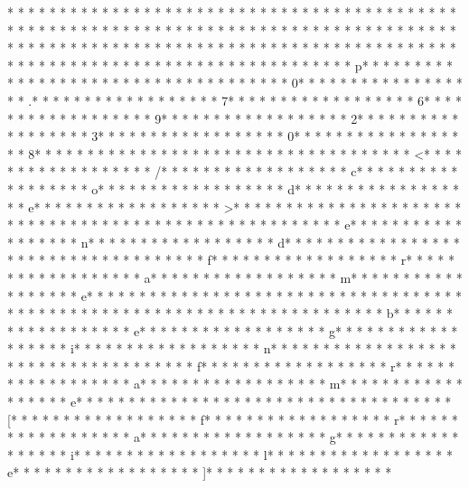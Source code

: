 * * *  * * *  * * *  *  * * *  *  * * *  *  * * *  * * *  * * *  *  * * *  *  * * *  *  * * *  * * *  * * *  *  * * *  *  * * *  *  * * *  * * *  * * *  *  * * *  *  * * *  *  * * *  * * *  * * *  *  * * *  *  * * *  *  * * *  * * *  * * *  *  * * *  *  * * *  *  * * *  * * *  * * *  *  * * *  *  * * *  *  * * *  * * *  * * *  *  * * *  *  * * *  *  * * *  * * *  * * *  *  * * *  *  * * *  * p* * *  * * *  * * *  *  * * *  *  * * *  * 
* * *  * * *  * * *  *  * * *  *  * * *  * 0* * *  * * *  * * *  *  * * *  *  * * *  * .* * *  * * *  * * *  *  * * *  *  * * *  * 7* * *  * * *  * * *  *  * * *  *  * * *  * 6* * *  * * *  * * *  *  * * *  *  * * *  * 9* * *  * * *  * * *  *  * * *  *  * * *  * 2* * *  * * *  * * *  *  * * *  *  * * *  * 3* * *  * * *  * * *  *  * * *  *  * * *  * 0* * *  * * *  * * *  *  * * *  *  * * *  * 8* * *  * * *  * * *  *  * * *  *  * * *  * 
* * *  * * *  * * *  *  * * *  *  * * *  * <* * *  * * *  * * *  *  * * *  *  * * *  * /* * *  * * *  * * *  *  * * *  *  * * *  * c* * *  * * *  * * *  *  * * *  *  * * *  * o* * *  * * *  * * *  *  * * *  *  * * *  * d* * *  * * *  * * *  *  * * *  *  * * *  * e* * *  * * *  * * *  *  * * *  *  * * *  * >* * *  * * *  * * *  *  * * *  *  * * *  * 
* * *  * * *  * * *  *  * * *  *  * * *  * 
* * *  * * *  * * *  *  * * *  *  * * *  * e* * *  * * *  * * *  *  * * *  *  * * *  * n* * *  * * *  * * *  *  * * *  *  * * *  * d* * *  * * *  * * *  *  * * *  *  * * *  * {* * *  * * *  * * *  *  * * *  *  * * *  * f* * *  * * *  * * *  *  * * *  *  * * *  * r* * *  * * *  * * *  *  * * *  *  * * *  * a* * *  * * *  * * *  *  * * *  *  * * *  * m* * *  * * *  * * *  *  * * *  *  * * *  * e* * *  * * *  * * *  *  * * *  *  * * *  * }* * *  * * *  * * *  *  * * *  *  * * *  * 
* * *  * * *  * * *  *  * * *  *  * * *  * 
* * *  * * *  * * *  *  * * *  *  * * *  * b* * *  * * *  * * *  *  * * *  *  * * *  * e* * *  * * *  * * *  *  * * *  *  * * *  * g* * *  * * *  * * *  *  * * *  *  * * *  * i* * *  * * *  * * *  *  * * *  *  * * *  * n* * *  * * *  * * *  *  * * *  *  * * *  * {* * *  * * *  * * *  *  * * *  *  * * *  * f* * *  * * *  * * *  *  * * *  *  * * *  * r* * *  * * *  * * *  *  * * *  *  * * *  * a* * *  * * *  * * *  *  * * *  *  * * *  * m* * *  * * *  * * *  *  * * *  *  * * *  * e* * *  * * *  * * *  *  * * *  *  * * *  * }* * *  * * *  * * *  *  * * *  *  * * *  * [* * *  * * *  * * *  *  * * *  *  * * *  * f* * *  * * *  * * *  *  * * *  *  * * *  * r* * *  * * *  * * *  *  * * *  *  * * *  * a* * *  * * *  * * *  *  * * *  *  * * *  * g* * *  * * *  * * *  *  * * *  *  * * *  * i* * *  * * *  * * *  *  * * *  *  * * *  * l* * *  * * *  * * *  *  * * *  *  * * *  * e* * *  * * *  * * *  *  * * *  *  * * *  * ]* * *  * * *  * * *  *  * * *  *  * * *  * 
